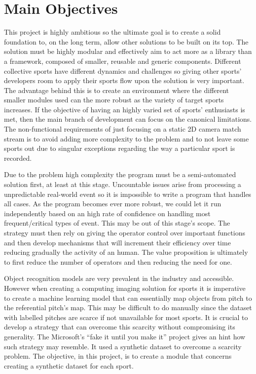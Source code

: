 \documentclass[
    11pt,
    oneside
]{report}
\begin{document}
\section{Main Objectives}



This project is highly ambitious so the ultimate goal is to create a solid foundation to, on the long term, allow other solutions to be built on its top. The solution must be highly modular and effectively aim to act more as a library than a framework, composed of smaller, reusable and generic components. Different collective sports have different dynamics and challenges so giving other sports' developers room to apply their sports flow upon the solution is very important. The advantage behind this is to create an environment where the different smaller modules used can the more robust as the variety of target sports increases. If the objective of having an highly varied set of sports' enthusiasts is met, then the main branch of development can focus on the canonical limitations. The non-functional requirements of just focusing on a static 2D camera match stream is to avoid adding more complexity to the problem and to not leave some sports out due to singular exceptions regarding the way a particular sport is recorded.


Due to the problem high complexity the program must be a semi-automated solution first, at least at this stage. Uncountable issues arise from processing a unpredictable real-world event so it is impossible to write a program that handles all cases. As the program becomes ever more robust, we could let it run independently based on an high rate of confidence on handling most frequent/critical types of event. This may be out of this stage's scope. The strategy must then rely on giving the operator control over important functions and then develop mechanisms that will increment their efficiency over time reducing gradually the activity of an human. The value proposition is ultimately to first reduce the number of operators and then reducing the need for one.


Object recognition models are very prevalent in the industry and accessible. However when creating a computing imaging solution for sports it is imperative to create a machine learning model that can essentially map objects from pitch to the referential pitch's map. This may be difficult to do manually since the dataset with labelled pitches are scarce if not unavailable for most sports. It is crucial to develop a strategy that can overcome this scarcity without compromising its generality. The Microsoft's ``fake it until you make it'' project \cite{ms_fake} gives an hint how such strategy may resemble. It used a synthetic dataset to overcome a scarcity problem. The objective, in this project, is to create a module that concerns creating a synthetic dataset for each sport.
\end{document}
